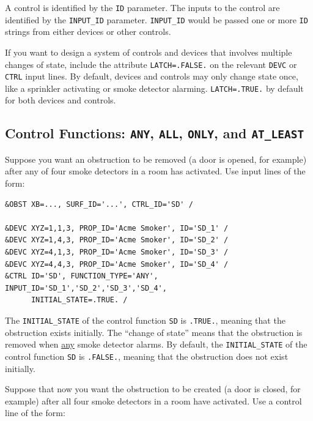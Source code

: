 \documentclass[11pt]{book}
\newcommand{\ct}{\tt\small}
\begin{document}
A control is identified by the {\ct ID} parameter.  The inputs to the control are identified
by the {\ct INPUT\_ID} parameter.  {\ct INPUT\_ID} would be passed one or more {\ct ID} strings
from either devices or other controls.


If you want to design a system of controls and devices that involves multiple changes of state,
include the attribute {\ct LATCH=.FALSE.} on the relevant {\ct DEVC} or {\ct CTRL} input lines.
By default, devices and controls may only change state once, like a sprinkler activating or
smoke detector alarming. {\ct LATCH=.TRUE.} by default for both devices and controls.

\subsection{Control Functions: \texorpdfstring{{\tt ANY}}{ANY}, \texorpdfstring{{\tt ALL}}{ALL}, \texorpdfstring{{\tt ONLY}}{ONLY}, and
\texorpdfstring{{\tt AT\_LEAST}}{AT_LEAST}}

Suppose you want an obstruction to be removed (a door is opened, for example) after any
of four smoke detectors in a room has activated. Use input lines of the form:

\footnotesize
\begin{verbatim}
&OBST XB=..., SURF_ID='...', CTRL_ID='SD' /

&DEVC XYZ=1,1,3, PROP_ID='Acme Smoker', ID='SD_1' /
&DEVC XYZ=1,4,3, PROP_ID='Acme Smoker', ID='SD_2' /
&DEVC XYZ=4,1,3, PROP_ID='Acme Smoker', ID='SD_3' /
&DEVC XYZ=4,4,3, PROP_ID='Acme Smoker', ID='SD_4' /
&CTRL ID='SD', FUNCTION_TYPE='ANY', INPUT_ID='SD_1','SD_2','SD_3','SD_4',
      INITIAL_STATE=.TRUE. /
\end{verbatim}
\normalsize

\noindent
The {\ct INITIAL\_STATE} of the control function {\ct SD} is {\ct .TRUE.},
meaning that the obstruction exists initially. The ``change of state'' means that the obstruction is
removed when \underline{any}  smoke detector alarms.  By default, the {\ct INITIAL\_STATE}
of the control function {\ct SD} is {\ct .FALSE.}, meaning that the obstruction does not exist initially.

Suppose that now you want the obstruction to be created (a door is closed, for example) after all 
four smoke detectors in a room have activated. Use a control line of the form:
\end{document}
